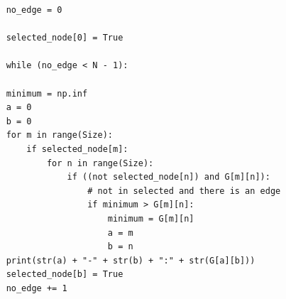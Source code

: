 \documentclass[addpoints,11pt]{exam}
\begin{document}
\begin{questions}
\begin{solutionorbox}
\begin{verbatim}
    no_edge = 0

    selected_node[0] = True

    while (no_edge < N - 1):
    
    minimum = np.inf
    a = 0
    b = 0
    for m in range(Size):
        if selected_node[m]:
            for n in range(Size):
                if ((not selected_node[n]) and G[m][n]):  
                    # not in selected and there is an edge
                    if minimum > G[m][n]:
                        minimum = G[m][n]
                        a = m
                        b = n
    print(str(a) + "-" + str(b) + ":" + str(G[a][b]))
    selected_node[b] = True
    no_edge += 1
\end{verbatim}
\end{solutionorbox}


\end{questions}
\end{document}
